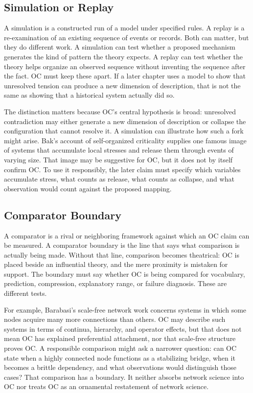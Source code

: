 \documentclass[11pt,a4paper,openany]{book}
\begin{document}
\subsection{Simulation or Replay}
A simulation is a constructed run of a model under specified rules. A replay is a re-examination of an existing sequence of events or records. Both can matter, but they do different work. A simulation can test whether a proposed mechanism generates the kind of pattern the theory expects. A replay can test whether the theory helps organize an observed sequence without inventing the sequence after the fact. OC must keep these apart. If a later chapter uses a model to show that unresolved tension can produce a new dimension of description, that is not the same as showing that a historical system actually did so. \cite{bak_soc,newman_networks}\par
The distinction matters because OC's central hypothesis is broad: unresolved contradiction may either generate a new dimension of description or collapse the configuration that cannot resolve it. A simulation can illustrate how such a fork might arise. Bak's account of self-organized criticality supplies one famous image of systems that accumulate local stresses and release them through events of varying size. That image may be suggestive for OC, but it does not by itself confirm OC. To use it responsibly, the later claim must specify which variables accumulate stress, what counts as release, what counts as collapse, and what observation would count against the proposed mapping.\par
\subsection{Comparator Boundary}
A comparator is a rival or neighboring framework against which an OC claim can be measured. A comparator boundary is the line that says what comparison is actually being made. Without that line, comparison becomes theatrical: OC is placed beside an influential theory, and the mere proximity is mistaken for support. The boundary must say whether OC is being compared for vocabulary, prediction, compression, explanatory range, or failure diagnosis. These are different tests. \cite{bak_soc,newman_networks}\par
For example, Barabasi's scale-free network work concerns systems in which some nodes acquire many more connections than others. OC may describe such systems in terms of continua, hierarchy, and operator effects, but that does not mean OC has explained preferential attachment, nor that scale-free structure proves OC. A responsible comparison might ask a narrower question: can OC state when a highly connected node functions as a stabilizing bridge, when it becomes a brittle dependency, and what observations would distinguish those cases? That comparison has a boundary. It neither absorbs network science into OC nor treats OC as an ornamental restatement of network science.\par
\end{document}
